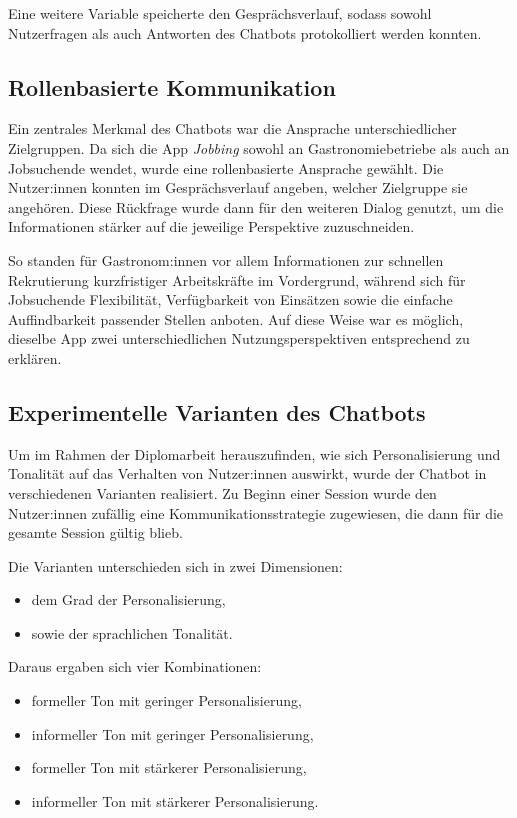 Eine weitere Variable speicherte den Gesprächsverlauf, sodass sowohl Nutzerfragen 
als auch Antworten des Chatbots protokolliert werden konnten.

\subsection{Rollenbasierte Kommunikation}

Ein zentrales Merkmal des Chatbots war die Ansprache unterschiedlicher Zielgruppen. 
Da sich die App \textit{Jobbing} sowohl an Gastronomiebetriebe als auch an Jobsuchende 
wendet, wurde eine rollenbasierte Ansprache gewählt. Die Nutzer:innen konnten 
im Gesprächsverlauf angeben, welcher Zielgruppe sie angehören. Diese Rückfrage 
wurde dann für den weiteren Dialog genutzt, um die Informationen stärker auf die 
jeweilige Perspektive zuzuschneiden.

So standen für Gastronom:innen vor allem Informationen zur schnellen Rekrutierung 
kurzfristiger Arbeitskräfte im Vordergrund, während sich für Jobsuchende 
Flexibilität, Verfügbarkeit von Einsätzen sowie die einfache Auffindbarkeit 
passender Stellen anboten. Auf diese Weise war es möglich, dieselbe App zwei 
unterschiedlichen Nutzungsperspektiven entsprechend zu erklären.

\subsection{Experimentelle Varianten des Chatbots}

Um im Rahmen der Diplomarbeit herauszufinden, wie sich Personalisierung und 
Tonalität auf das Verhalten von Nutzer:innen auswirkt, wurde der Chatbot in 
verschiedenen Varianten realisiert. Zu Beginn einer Session wurde den Nutzer:innen 
zufällig eine Kommunikationsstrategie zugewiesen, die dann für die gesamte 
Session gültig blieb.

Die Varianten unterschieden sich in zwei Dimensionen:
\begin{itemize}
    \item dem Grad der Personalisierung,
    \item sowie der sprachlichen Tonalität.
\end{itemize}

Daraus ergaben sich vier Kombinationen:
\begin{itemize}
    \item formeller Ton mit geringer Personalisierung,
    \item informeller Ton mit geringer Personalisierung,
    \item formeller Ton mit stärkerer Personalisierung,
    \item informeller Ton mit stärkerer Personalisierung.
\end{itemize}

